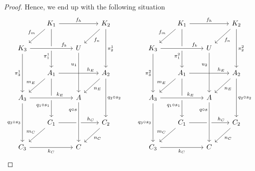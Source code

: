 \begin{proof}
	Hence, we end up with the following situation
	\[
		\begin{tikzcd}[row sep = 20, column sep = 20]
	& {K_1} && {K_2} \\
	{K_3} && U \\
	& {A_1} && {A_2} \\
	{A_3} && A \\
	& {C_1} && {C_2} \\
	{C_3} && C
	\arrow["{f_h}", from=1-2, to=1-4]
	\arrow["{f_m}"', from=1-2, to=2-1]
	\arrow["{\pi_1^1}"'{pos=0.7}, from=1-2, to=3-2]
	\arrow["{f_n}", from=1-4, to=2-3]
	\arrow["{\pi^1_2}", from=1-4, to=3-4]
	\arrow["{f_k}"{pos=0.8}, from=2-1, to=2-3, crossing over]
	\arrow["{\pi_3^1}"', from=2-1, to=4-1]
	\arrow["{u_1}"'{pos=0.3}, from=2-3, to=4-3, crossing over]
	\arrow["{h_E}"{pos=0.8}, from=3-2, to=3-4]
	\arrow["{m_E}"', from=3-2, to=4-1]
	\arrow["{q_1\circ s_1}"'{pos=0.7}, from=3-2, to=5-2]
	\arrow["{n_E}", from=3-4, to=4-3]
	\arrow["{q_2\circ s_2}", from=3-4, to=5-4]
	\arrow["{k_E}"{pos=0.7}, from=4-1, to=4-3, crossing over]
	\arrow["{q_3\circ s_3}"', from=4-1, to=6-1]
	\arrow["{h_C}"{pos=0.8}, from=5-2, to=5-4]
	\arrow["{q\circ s}"'{pos=0.2}, from=4-3, to=6-3, crossing over]
	\arrow["{m_C}"', from=5-2, to=6-1]
	\arrow["{n_C}", from=5-4, to=6-3]
	\arrow["{k_C}"', from=6-1, to=6-3]
	\end{tikzcd}
		\qquad
		\begin{tikzcd}[row sep = 20, column sep = 20]
	& {K_1} && {K_2} \\
	{K_3} && U \\
	& {A_1} && {A_2} \\
	{A_3} && A \\
	& {C_1} && {C_2} \\
	{C_3} && C
	\arrow["{f_h}", from=1-2, to=1-4]
	\arrow["{f_m}"', from=1-2, to=2-1]
	\arrow["{\pi_1^2}"'{pos=0.7}, from=1-2, to=3-2]
	\arrow["{f_n}", from=1-4, to=2-3]
	\arrow["{\pi^2_2}", from=1-4, to=3-4]
	\arrow["{f_k}"{pos=0.8}, from=2-1, to=2-3, crossing over]
	\arrow["{\pi_3^2}"', from=2-1, to=4-1]
	\arrow["{u_2}"'{pos=0.3}, from=2-3, to=4-3, crossing over]
	\arrow["{h_E}"{pos=0.8}, from=3-2, to=3-4]
	\arrow["{m_E}"', from=3-2, to=4-1]
	\arrow["{q_1\circ s_1}"'{pos=0.7}, from=3-2, to=5-2]
	\arrow["{n_E}", from=3-4, to=4-3]
	\arrow["{q_2\circ s_2}", from=3-4, to=5-4]
	\arrow["{k_E}"{pos=0.7}, from=4-1, to=4-3, crossing over]
	\arrow["{q_3\circ s_3}"', from=4-1, to=6-1]
	\arrow["{h_C}"{pos=0.8}, from=5-2, to=5-4]
	\arrow["{q\circ s}"'{pos=0.2}, from=4-3, to=6-3, crossing over]
	\arrow["{m_C}"', from=5-2, to=6-1]
	\arrow["{n_C}", from=5-4, to=6-3]
	\arrow["{k_C}"', from=6-1, to=6-3]
		\end{tikzcd}\]


\end{proof}
